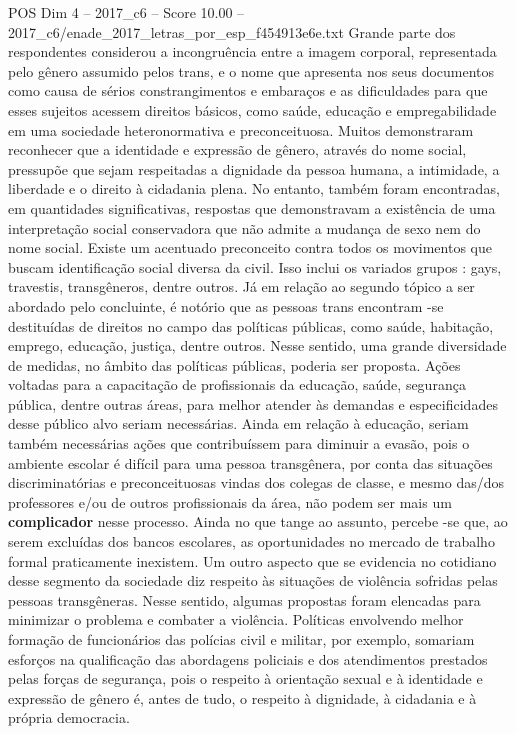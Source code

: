 \begin{textsample}{POS Dim 4 – 2017\_c6 – Score 10.00 – 2017\_c6/enade\_2017\_letras\_por\_esp\_f454913e6e.txt}
Grande parte dos respondentes considerou a incongruência entre a imagem corporal, representada pelo gênero assumido pelos trans, e o nome que apresenta nos seus documentos como causa de sérios constrangimentos e embaraços e as dificuldades para que esses sujeitos acessem direitos básicos, como saúde, educação e empregabilidade em uma sociedade heteronormativa e preconceituosa.
Muitos demonstraram reconhecer que a identidade e expressão de gênero, através do nome social, pressupõe que sejam respeitadas a dignidade da pessoa humana, a intimidade, a liberdade e o direito à cidadania plena.
No entanto, também foram encontradas, em quantidades significativas, respostas que demonstravam a existência de uma interpretação social conservadora que não admite a mudança de sexo nem do nome social.
Existe um acentuado preconceito contra todos os movimentos que buscam identificação social diversa da civil.
Isso inclui os variados grupos : gays, travestis, transgêneros, dentre outros.
Já em relação ao segundo tópico a ser abordado pelo concluinte, é notório que as pessoas trans encontram -se destituídas de direitos no campo das políticas públicas, como saúde, habitação, emprego, educação, justiça, dentre outros.
Nesse sentido, uma grande diversidade de medidas, no âmbito das políticas públicas, poderia ser proposta.
Ações voltadas para a capacitação de profissionais da educação, saúde, segurança pública, dentre outras áreas, para melhor atender às demandas e especificidades desse público alvo seriam necessárias.
Ainda em relação à educação, seriam também necessárias ações que contribuíssem para diminuir a evasão, pois o ambiente escolar é difícil para uma pessoa transgênera, por conta das situações discriminatórias e preconceituosas vindas dos colegas de classe, e mesmo das/dos professores e/ou de outros profissionais da área, não podem ser mais um \textbf{complicador} nesse processo.
Ainda no que tange ao assunto, percebe -se que, ao serem excluídas dos bancos escolares, as oportunidades no mercado de trabalho formal praticamente inexistem.
Um outro aspecto que se evidencia no cotidiano desse segmento da sociedade diz respeito às situações de violência sofridas pelas pessoas transgêneras.
Nesse sentido, algumas propostas foram elencadas para minimizar o problema e combater a violência.
Políticas envolvendo melhor formação de funcionários das polícias civil e militar, por exemplo, somariam esforços na qualificação das abordagens policiais e dos atendimentos prestados pelas forças de segurança, pois o respeito à orientação sexual e à identidade e expressão de gênero é, antes de tudo, o respeito à dignidade, à cidadania e à própria democracia.

\end{textsample}
